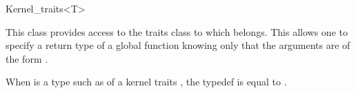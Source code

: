 \begin{ccRefClass}{Kernel_traits<T>}

\ccDefinition

This class provides access to the traits class to which  belongs.
This allows one to specify a return type of a global function knowing only that
the arguments are of the form .


\ccTypes

{ When  is a type such as  of a kernel traits ,
the  typedef is equal to . }

\ccTexHtml{\KernelRefLayout}{}
\end{ccRefClass}


